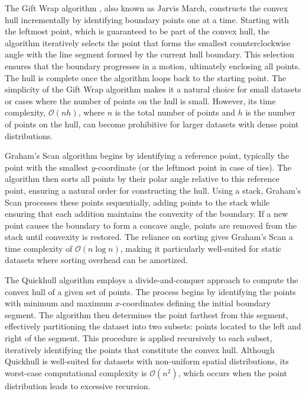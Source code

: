 The Gift Wrap algorithm \cite{chan1996optimal}, also known as Jarvis March, constructs the convex hull incrementally by identifying boundary points one at a time. Starting with the leftmost point, which is guaranteed to be part of the convex hull, the algorithm iteratively selects the point that forms the smallest counterclockwise angle with the line segment formed by the current hull boundary. This selection ensures that the boundary progresses in a  motion, ultimately enclosing all points. The hull is complete once the algorithm loops back to the starting point. The simplicity of the Gift Wrap algorithm makes it a natural choice for small datasets or cases where the number of points on the hull is small. However, its time complexity, \(\mathcal{O}(nh)\), where \(n\) is the total number of points and \(h\) is the number of points on the hull, can become prohibitive for larger datasets with dense point distributions.

Graham’s Scan algorithm \cite{xu2010concave} begins by identifying a reference point, typically the point with the smallest \(y\)-coordinate (or the leftmost point in case of ties). The algorithm then sorts all points by their polar angle relative to this reference point, ensuring a natural order for constructing the hull. Using a stack, Graham’s Scan processes these points sequentially, adding points to the stack while ensuring that each addition maintains the convexity of the boundary. If a new point causes the boundary to form a concave angle, points are removed from the stack until convexity is restored. The reliance on sorting gives Graham’s Scan a time complexity of \(\mathcal{O}(n \log n)\), making it particularly well-suited for static datasets where sorting overhead can be amortized.



The Quickhull algorithm employs a divide-and-conquer approach to compute the convex hull of a given set of points. The process begins by identifying the points with minimum and maximum \(x\)-coordinates defining the initial boundary segment. The algorithm then determines the point farthest from this segment, effectively partitioning the dataset into two subsets: points located to the left and right of the segment. This procedure is applied recursively to each subset, iteratively identifying the points that constitute the convex hull. Although Quickhull is well-suited for datasets with non-uniform spatial distributions, its worst-case computational complexity is \(\mathcal{O}(n^2)\), which occurs when the point distribution leads to excessive recursion.




